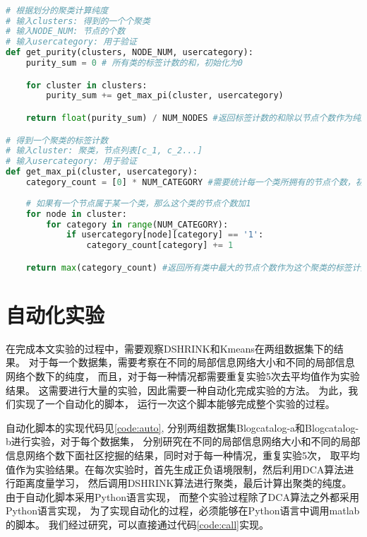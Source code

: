 \begin{lstlisting}[language={python}, caption={计算聚类的纯度}, label=code:purity]

# 根据划分的聚类计算纯度
# 输入clusters: 得到的一个个聚类
# 输入NODE_NUM: 节点的个数
# 输入usercategory: 用于验证
def get_purity(clusters, NODE_NUM, usercategory):
    purity_sum = 0 # 所有类的标签计数的和，初始化为0

    for cluster in clusters:
        purity_sum += get_max_pi(cluster, usercategory)

    return float(purity_sum) / NUM_NODES #返回标签计数的和除以节点个数作为纯度

# 得到一个聚类的标签计数
# 输入cluster: 聚类，节点列表[c_1, c_2...] 
# 输入usercategory: 用于验证
def get_max_pi(cluster, usercategory):
    category_count = [0] * NUM_CATEGORY #需要统计每一个类所拥有的节点个数，初始化都为0
    
    # 如果有一个节点属于某一个类，那么这个类的节点个数加1
    for node in cluster:
        for category in range(NUM_CATEGORY):
            if usercategory[node][category] == '1':
                category_count[category] += 1

    return max(category_count) #返回所有类中最大的节点个数作为这个聚类的标签计数

\end{lstlisting}


\section{自动化实验}

在完成本文实验的过程中，需要观察DSHRINK和Kmeans在两组数据集下的结果。
对于每一个数据集，需要考察在不同的局部信息网络大小和不同的局部信息网络个数下的纯度，
而且，对于每一种情况都需要重复实验5次去平均值作为实验结果。
这需要进行大量的实验，因此需要一种自动化完成实验的方法。
为此，我们实现了一个自动化的脚本，
运行一次这个脚本能够完成整个实验的过程。

自动化脚本的实现代码见\ref{code:auto}, 分别两组数据集Blogcatalog-a和Blogcatalog-b进行实验，对于每个数据集，
分别研究在不同的局部信息网络大小和不同的局部信息网络个数下面社区挖掘的结果，同时对于每一种情况，重复实验5次，
取平均值作为实验结果。在每次实验时，首先生成正负语境限制，然后利用DCA算法进行距离度量学习，
然后调用DSHRINK算法进行聚类，最后计算出聚类的纯度。
由于自动化脚本采用Python语言实现，
而整个实验过程除了DCA算法之外都采用Python语言实现，
为了实现自动化的过程，必须能够在Python语言中调用matlab的脚本。
我们经过研究，可以直接通过代码\ref{code:call}实现。

